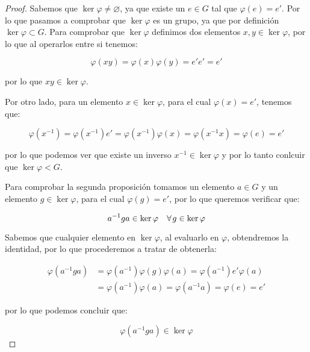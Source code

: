         \begin{proof}
            Sabemos que $\ker{\varphi} \ne \varnothing$, ya que existe un $e \in G$ tal que $\varphi(e) = e'$.
            Por lo que pasamos a comprobar que $\ker{\varphi}$ es un grupo, ya que por definición $\ker{\varphi} \subset G$.
            Para comprobar que $\ker{\varphi}$ definimos dos elementos $x, y \in \ker{\varphi}$, por lo que al operarlos entre si tenemos:

            \begin{equation*}
                \varphi(x y) = \varphi(x) \varphi(y) = e' e' = e'
            \end{equation*}

            por lo que $xy \in \ker{\varphi}$.

            Por otro lado, para un elemento $x \in \ker{\varphi}$, para el cual $\varphi(x) = e'$, tenemos que:

            \begin{equation*}
                \varphi(x^{-1}) = \varphi(x^{-1}) e' = \varphi(x^{-1}) \varphi(x) = \varphi(x^{-1} x) = \varphi(e) = e'
            \end{equation*}

            por lo que podemos ver que existe un inverso $x^{-1} \in \ker{\varphi}$ y por lo tanto conlcuir que $\ker{\varphi} < G$.

            Para comprobar la segunda proposición tomamos un elemento $a \in G$ y un elemento $g \in \ker{\varphi}$, para el cual $\varphi(g) = e'$, por lo que queremos verificar que:

            \begin{equation*}
                a^{-1} g a \in \ker{\varphi} \quad \forall \mkern2mu g \in \ker{\varphi}
            \end{equation*}

            Sabemos que cualquier elemento en $\ker{\varphi}$, al evaluarlo en $\varphi$, obtendremos la identidad, por lo que procederemos a tratar de obtenerla:

            \begin{align*}
                \varphi(a^{-1} g a) &= \varphi(a^{-1}) \varphi(g) \varphi(a) = \varphi(a^{-1}) e' \varphi(a) \\
                &= \varphi(a^{-1}) \varphi(a) = \varphi(a^{-1} a) = \varphi(e) = e'
            \end{align*}

            por lo que podemos concluir que:

            \begin{equation*}
                \varphi(a^{-1} g a) \in \ker{\varphi}
            \end{equation*}
        \end{proof}

